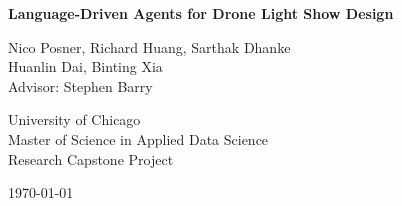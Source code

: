 
\begin{titlepage}
\centering
\vspace*{2in}

{\fontsize{18}{22}\bfseries\selectfont
Language-Driven Agents for Drone Light Show Design\par}

\vspace{1in}

{\fontsize{12}{14}\selectfont
Nico Posner, Richard Huang, Sarthak Dhanke\\
Huanlin Dai, Binting Xia\\
Advisor: Stephen Barry\par}

\vspace{0.5in}

{\fontsize{14}{16}\selectfont
University of Chicago\\
Master of Science in Applied Data Science\\
Research Capstone Project\par}
\vspace{0.5in}

{\fontsize{14}{16}\selectfont\today\par}
\end{titlepage}

